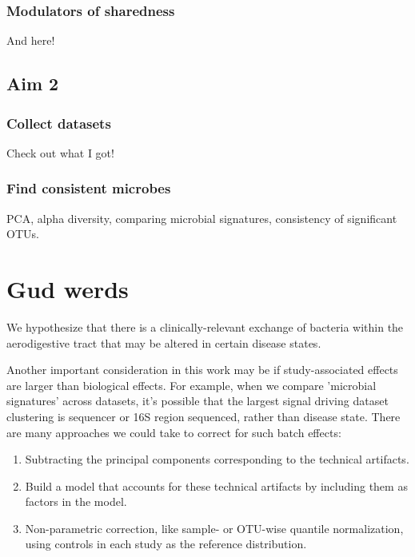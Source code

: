 \documentclass[12pt]{article}
\begin{document}
\subsubsection{Modulators of sharedness}
And here!

\subsection{Aim 2}
\subsubsection{Collect datasets}
Check out what I got!

\subsubsection{Find consistent microbes}
PCA, alpha diversity, comparing microbial signatures, consistency of significant OTUs.

\section{Gud werds}
We hypothesize that there is a clinically-relevant exchange of bacteria within the aerodigestive tract that may be altered in certain disease states. 


Another important consideration in this work may be if study-associated effects are larger than biological effects. For example, when we compare 'microbial signatures' across datasets, it's possible that the largest signal driving dataset clustering is sequencer or 16S region sequenced, rather than disease state. There are many approaches we could take to correct for such batch effects:
\begin{enumerate}
	\item Subtracting the principal components corresponding to the technical artifacts.
	\item Build a model that accounts for these technical artifacts by including them as factors in the model.
	\item Non-parametric correction, like sample- or OTU-wise quantile normalization, using controls in each study as the reference distribution.
\end{enumerate}
\end{document}
